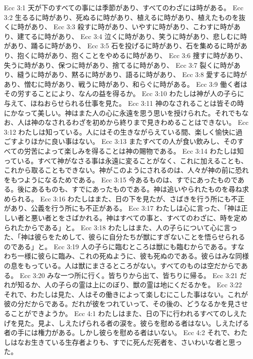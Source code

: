 Ecc 3:1  天が下のすべての事には季節があり、すべてのわざには時がある。
Ecc 3:2  生るるに時があり、死ぬるに時があり、植えるに時があり、植えたものを抜くに時があり、
Ecc 3:3  殺すに時があり、いやすに時があり、こわすに時があり、建てるに時があり、
Ecc 3:4  泣くに時があり、笑うに時があり、悲しむに時があり、踊るに時があり、
Ecc 3:5  石を投げるに時があり、石を集めるに時があり、抱くに時があり、抱くことをやめるに時があり、
Ecc 3:6  捜すに時があり、失うに時があり、保つに時があり、捨てるに時があり、
Ecc 3:7  裂くに時があり、縫うに時があり、黙るに時があり、語るに時があり、
Ecc 3:8  愛するに時があり、憎むに時があり、戦うに時があり、和らぐに時がある。
Ecc 3:9  働く者はその労することにより、なんの益を得るか。
Ecc 3:10  わたしは神が人の子らに与えて、ほねおらせられる仕事を見た。
Ecc 3:11  神のなされることは皆その時にかなって美しい。神はまた人の心に永遠を思う思いを授けられた。それでもなお、人は神のなされるわざを初めから終りまで見きわめることはできない。
Ecc 3:12  わたしは知っている。人にはその生きながらえている間、楽しく愉快に過ごすよりほかに良い事はない。
Ecc 3:13  またすべての人が食い飲みし、そのすべての労苦によって楽しみを得ることは神の賜物である。
Ecc 3:14  わたしは知っている。すべて神がなさる事は永遠に変ることがなく、これに加えることも、これから取ることもできない。神がこのようにされるのは、人々が神の前に恐れをもつようになるためである。
Ecc 3:15  今あるものは、すでにあったものである。後にあるものも、すでにあったものである。神は追いやられたものを尋ね求められる。
Ecc 3:16  わたしはまた、日の下を見たが、さばきを行う所にも不正があり、公義を行う所にも不正がある。
Ecc 3:17  わたしは心に言った、「神は正しい者と悪い者とをさばかれる。神はすべての事と、すべてのわざに、時を定められたからである」と。
Ecc 3:18  わたしはまた、人の子らについて心に言った、「神は彼らをためして、彼らに自分たちが獣にすぎないことを悟らせられるのである」と。
Ecc 3:19  人の子らに臨むところは獣にも臨むからである。すなわち一様に彼らに臨み、これの死ぬように、彼も死ぬのである。彼らはみな同様の息をもっている。人は獣にまさるところがない。すべてのものは空だからである。
Ecc 3:20  みな一つ所に行く。皆ちりから出て、皆ちりに帰る。
Ecc 3:21  だれが知るか、人の子らの霊は上にのぼり、獣の霊は地にくだるかを。
Ecc 3:22  それで、わたしは見た、人はその働きによって楽しむにこした事はない。これが彼の分だからである。だれが彼をつれていって、その後の、どうなるかを見させることができようか。
Ecc 4:1  わたしはまた、日の下に行われるすべてのしえたげを見た。見よ、しえたげられる者の涙を。彼らを慰める者はない。しえたげる者の手には権力がある。しかし彼らを慰める者はいない。
Ecc 4:2  それで、わたしはなお生きている生存者よりも、すでに死んだ死者を、さいわいな者と思った。
